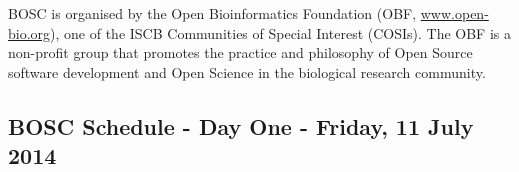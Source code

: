 \documentclass[10pt,oneside]{article}
\begin{document}
\pagestyle{fancy}

\noindent
BOSC is organised by the Open Bioinformatics Foundation
(OBF, \href{http://www.open-bio.org}{www.open-bio.org}),
one of the ISCB Communities of Special Interest (COSIs).
The OBF is a non-profit group that promotes the practice and
philosophy of Open Source software development and Open Science in
the biological research community.

\subsection*{BOSC Schedule - Day One - Friday, 11 July 2014}
\end{document}
